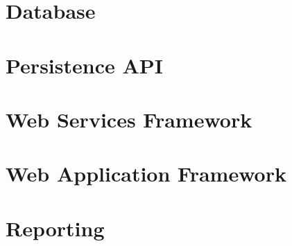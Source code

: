 \section{Database}


\section{Persistence API}


\section{Web Services Framework}


\section{Web Application Framework}


\section{Reporting}

